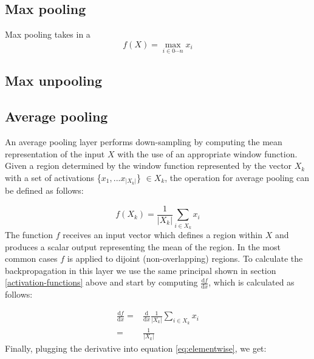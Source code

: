 \documentclass[a4paper]{article}
\begin{document}
\subsection{Max pooling}
Max pooling takes in a 
\begin{equation}
f(X)=\max\limits_{i \in 0 \cdots n} x_i
\end{equation}


\subsection{Max unpooling}
\subsection{Average pooling}

An average pooling layer performs down-sampling by computing the mean representation of the input $X$ with the use of an appropriate window function. Given a region determined by the window function represented by the vector $X_k$ with a set of activations \{$x_1,... x_{|X_k|}$\} $\in X_k$, the operation for average pooling can be defined as follows:

\begin{equation}
f(X_k) = \frac{1}{|X_k|}\sum\limits_{i \in X_k} x_{i} 
\end{equation}
The function $f$ receives an input vector which defines a region within $X$ and produces a scalar output representing the mean of the region. In the most common cases $f$ is applied to dijoint (non-overlapping) regions. To calculate the backpropagation in this layer we use the same principal shown in section \ref{activation-functions} above and start by computing $\frac{\mathrm{d}f}{\mathrm{d}x}$, which is calculated as follows:

\begin{align}
\frac{\mathrm{d}f}{\mathrm{d}x} 
= & \frac{\mathrm{d}}{\mathrm{d}x} \frac{1}{|X_k|}\sum\limits_{i \in X_k} x_{i}  \\
= & \frac{1}{|X_k|}
\end{align}
Finally, plugging the derivative into equation \ref{eq:elementwise}, we get:
\end{document}

